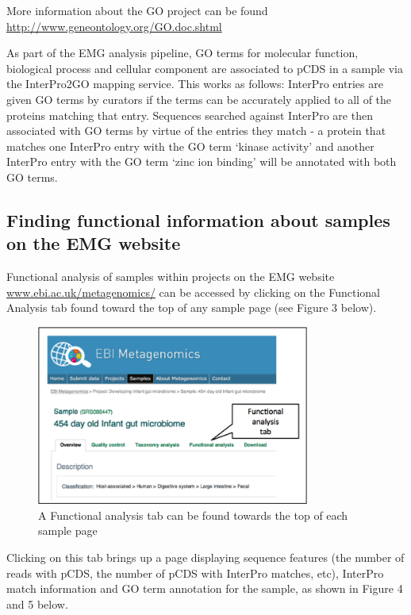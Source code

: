 More information about the GO project can be found \url{http://www.geneontology.org/GO.doc.shtml}

As part of the EMG analysis pipeline, GO terms for molecular function, biological process and cellular component are associated to pCDS in a sample via the InterPro2GO mapping service. This works as follows: InterPro entries are given GO terms by curators if the terms can be accurately applied to all of the proteins matching that entry. Sequences searched against InterPro are then associated with GO terms by virtue of the entries they match - a protein that matches one InterPro entry with the GO term ‘kinase activity’ and another InterPro entry with the GO term ‘zinc ion binding’ will be annotated with both GO terms.

\subsection{Finding functional information about samples on the EMG website}

Functional analysis of samples within projects on the EMG website \url{www.ebi.ac.uk/metagenomics/} can be accessed by clicking on the Functional Analysis tab found toward the top of any sample page (see Figure 3 below).

\begin{figure}[Figure 3]
\centering
\includegraphics[width=0.8\textwidth]{handout/FA.png}
\caption{A Functional analysis tab can be found towards the top of each sample page}
\label{fig:FA}
\end{figure}

Clicking on this tab brings up a page displaying sequence features (the number of reads with pCDS, the number of pCDS with InterPro matches, etc), InterPro match information and GO term annotation for the sample, as shown in Figure 4 and 5 below.

